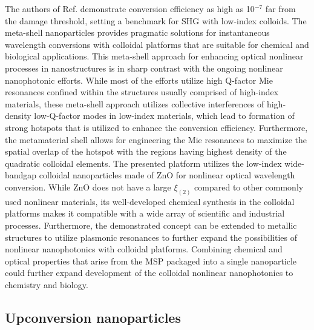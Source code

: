 \documentclass[journal=chreay,manuscript=review]{achemso}
\begin{document}
The authors of Ref. demonstrate conversion efficiency as high as 10$^{-7}$ far from the damage threshold, setting a benchmark for SHG with low-index colloids. The meta-shell nanoparticles provides pragmatic solutions for instantaneous wavelength conversions with colloidal platforms that are suitable for chemical and biological applications. This meta-shell approach for enhancing optical nonlinear processes in nanostructures is in sharp contrast with the ongoing nonlinear nanophotonic efforts. While most of the efforts utilize high Q-factor Mie resonances confined within the structures usually comprised of high-index materials, these meta-shell approach utilizes collective interferences of high-density low-Q-factor modes in low-index materials, which lead to formation of strong hotspots that is utilized to enhance the conversion efficiency. Furthermore, the metamaterial shell allows for engineering the Mie resonances  to maximize the spatial overlap of the hotspot with the regions having highest  density of the quadratic colloidal elements. The presented platform utilizes the low-index wide-bandgap colloidal nanoparticles made of ZnO for nonlinear optical wavelength conversion. While ZnO does not have a large $\xi_{(2)}$ compared to other commonly used nonlinear materials, its well-developed chemical synthesis in the colloidal platforms makes it compatible with a wide array of scientific and industrial processes. Furthermore, the demonstrated concept
can be extended to metallic structures to utilize plasmonic resonances to further expand the possibilities of nonlinear nanophotonics with colloidal platforms. Combining chemical and optical properties that arise from the MSP packaged into a single nanoparticle could further expand development of the colloidal nonlinear nanophotonics to chemistry and biology.

\subsection{Upconversion nanoparticles}
\end{document}
